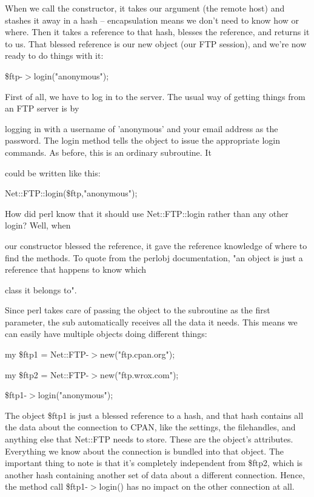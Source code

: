 \documentclass[a4paper,11pt]{book}
\begin{document}
\noindent 

\noindent When we call the constructor, it takes our argument (the remote host) and stashes it away in a hash -- encapsulation means we don't need to know how or where. Then it takes a reference to that hash, blesses the reference, and returns it to us. That blessed reference is our new object (our FTP session), and we're now ready to do things with it:

\noindent 

\noindent \$ftp-$>$login("anonymous");

\noindent 

\noindent 

\noindent First of all, we have to log in to the server. The usual way of getting things from an FTP server is by

\noindent logging in with a username of 'anonymous' and your email address as the password. The login method tells the object to issue the appropriate login commands. As before, this is an ordinary subroutine. It

\noindent could be written like this:

\noindent 

\noindent Net::FTP::login(\$ftp,"anonymous");

\noindent 

\noindent How did perl know that it should use Net::FTP::login rather than any other login? Well, when

\noindent our constructor blessed the reference, it gave the reference knowledge of where to find the methods. To quote from the perlobj documentation, "an object is just a reference that happens to know which

\noindent class it belongs to".

\noindent 

\noindent Since perl takes care of passing the object to the subroutine as the first parameter, the sub automatically receives all the data it needs. This means we can easily have multiple objects doing different things:

\noindent 

\noindent my \$ftp1 = Net::FTP-$>$new("ftp.cpan.org");

\noindent my \$ftp2 = Net::FTP-$>$new("ftp.wrox.com");

\noindent \$ftp1-$>$login("anonymous");

\noindent 

\noindent The object \$ftp1 is just a blessed reference to a hash, and that hash contains all the data about the connection to CPAN, like the settings, the filehandles, and anything else that Net::FTP needs to store. These are the object's attributes. Everything we know about the connection is bundled into that object. The important thing to note is that it's completely independent from \$ftp2, which is another hash containing another set of data about a different connection. Hence, the method call \$ftp1-$>$login() has no impact on the other connection at all.
\end{document}
